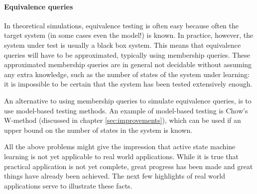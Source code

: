 \documentclass[multi,crop=false,class=article]{standalone}
\begin{document}
\paragraph{Equivalence queries} In theoretical simulations, equivalence testing
is often easy because often the target system (in some cases even the model!) is
known. In practice, however, the system under test is usually a black box
system. This means that equivalence queries will have to be approximated,
typically using membership queries. These approximated membership queries are in
general not decidable without assuming any extra knowledge\cite{Steffen11a},
such as the number of states of the system under learning: it is impossible to
be certain that the system has been tested extensively enough.

An alternative to using membership queries to simulate equivalence queries, is
to use model-based testing methods\cite{Broy05, Tretmans11}. An example of
model-based testing is Chow's W-method\cite{Chow78} (discussed in chapter
\cref{sec:improvements}), which can be used if an upper bound on the number of
states in the system is known.


All the above problems might give the impression that active state machine
learning is not yet applicable to real world applications. While it is true that
practical application is not yet complete, great progress has been made and
great things have already been achieved. The next few highlights of real world
applications serve to illustrate these facts.
\end{document}

